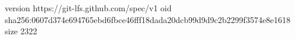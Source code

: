 version https://git-lfs.github.com/spec/v1
oid sha256:0607d374e694765ebd6fbce46fff18dada20dcb99d9d9c2b2299f3574e8e1618
size 2322
